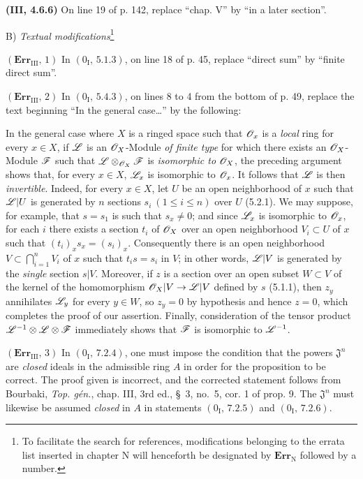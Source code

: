 \noindent\textbf{(III, 4.6.6)} On line 19 of p. 142, replace ``chap. V'' by
``in a later section''.

\begin{center}
B) \emph{Textual modifications}\footnote{To facilitate the search for
references, modifications belonging to the errata list inserted in chapter N
will henceforth be designated by $\mathbf{Err}_{\mathrm N}$ followed by a
number.}
\end{center}

\noindent\textbf{$(\mathbf{Err}_{\mathrm{III}},\,1)$} In
$(0_{\mathrm I},\,5.1.3)$, on line 18 of p. 45, replace ``direct sum'' by
``finite direct sum''.

\noindent\textbf{$(\mathbf{Err}_{\mathrm{III}},\,2)$} In
$(0_{\mathrm I},\,5.4.3)$, on lines 8 to 4 from the bottom of p. 49, replace
the text beginning ``In the general case\ldots{}'' by the following:

In the general case where $X$ is a ringed space such that $\mathscr{O}_x$ is a
\emph{local} ring for
every $x\in X$, if $\mathscr{L}$ is an $\mathscr{O}_X$-Module \emph{of finite type} for
which there exists an $\mathscr{O}_X$-Module $\mathscr{F}$ such that
$\mathscr{L}\otimes_{\mathscr{O}_X}\mathscr{F}$ is \emph{isomorphic to} $\mathscr{O}_X$, the
preceding argument shows that, for every $x\in X$, $\mathscr{L}_x$ is isomorphic to
$\mathscr{O}_x$. It follows that $\mathscr{L}$ is then \emph{invertible}. Indeed, for
every $x\in X$, let $U$ be an open neighborhood of $x$ such that $\mathscr{L}|U$ is
generated by $n$ sections $s_i\ (1\leq i\leq n)$ over $U$ (5.2.1). We may
suppose, for example, that $s=s_1$ is such that $s_x\ne0$; and since
$\mathscr{L}_x$ is isomorphic to $\mathscr{O}_x$, for each $i$ there exists a section
$t_i$ of $\mathscr{O}_X$ over an open neighborhood $V_i\subset U$ of $x$ such that
$(t_i)_x s_x=(s_i)_x$. Consequently there is an open neighborhood
$V\subset\bigcap_{i=1}^nV_i$ of $x$ such that $t_i s=s_i$ in $V$; in other
words, $\mathscr{L}|V$ is generated by the \emph{single} section $s|V$. Moreover,
if $z$ is a section over an open subset $W\subset V$ of the kernel of the
homomorphism $\mathscr{O}_X|V\to\mathscr{L}|V$ defined by $s$ (5.1.1), then $z_y$
annihilates $\mathscr{L}_y$ for every $y\in W$, so $z_y=0$ by hypothesis and hence
$z=0$, which completes the proof of our assertion. Finally, consideration of
the tensor product $\mathscr{L}^{-1}\otimes\mathscr{L}\otimes\mathscr{F}$ immediately shows
that $\mathscr{F}$ is isomorphic to $\mathscr{L}^{-1}$.

\noindent\textbf{$(\mathbf{Err}_{\mathrm{III}},\,3)$} In
$(0_{\mathrm I},\,7.2.4)$, one must impose the condition that the powers
$\mathfrak J^n$ are \emph{closed} ideals in the admissible ring $A$ in order
for the proposition to be correct. The proof given is incorrect, and the
corrected statement follows from Bourbaki, \emph{Top. gén.}, chap. III, 3rd
ed., \S~3, no.~5, cor. 1 of prop. 9. The $\mathfrak J^n$ must likewise be
assumed \emph{closed} in $A$ in statements $(0_{\mathrm I},\,7.2.5)$ and
$(0_{\mathrm I},\,7.2.6)$.

